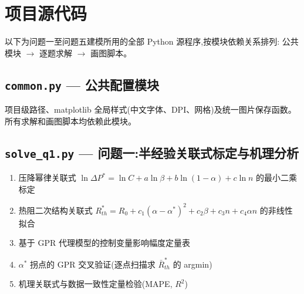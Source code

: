 

\section{项目源代码}

以下为问题一至问题五建模所用的全部 Python 源程序,按模块依赖关系排列:
公共模块 $\rightarrow$ 逐题求解 $\rightarrow$ 画图脚本。

\subsection{\texttt{common.py} — 公共配置模块}

项目级路径、matplotlib 全局样式(中文字体、DPI、网格)及统一图片保存函数。
所有求解和画图脚本均依赖此模块。



\newpage
\subsection{\texttt{solve\_q1.py} — 问题一:半经验关联式标定与机理分析}

\begin{enumerate}[label=(\arabic*)]
    \item 压降幂律关联式 $\ln\Delta P^*=\ln C+a\ln\beta+b\ln(1-\alpha)+c\ln n$ 的最小二乘标定
    \item 热阻二次结构关联式 $R_{th}^*=R_0+c_1(\alpha-\alpha^*)^2+c_2\beta+c_3 n+c_4\alpha n$ 的非线性拟合
    \item 基于 GPR 代理模型的控制变量影响幅度定量表
    \item $\alpha^*$ 拐点的 GPR 交叉验证(逐点扫描求 $\bar{R}_{th}^*$ 的 argmin)
    \item 机理关联式与数据一致性定量检验(MAPE, $R^2$)
\end{enumerate}

